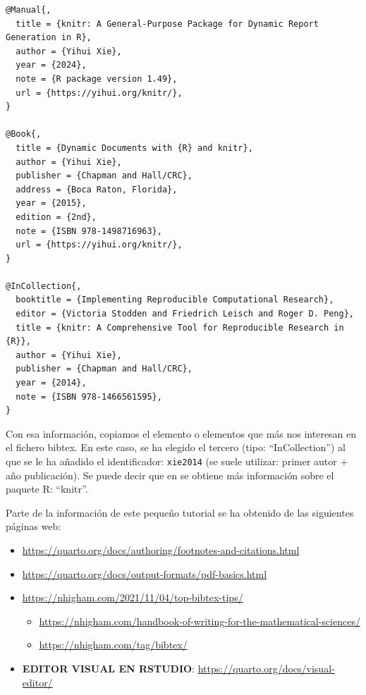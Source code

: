 \documentclass[
  11pt,
  a4paper,
  DIV=11,
  numbers=noendperiod]{scrartcl}
\providecommand{\tightlist}{%
  \setlength{\itemsep}{0pt}\setlength{\parskip}{0pt}}\usepackage{longtable,booktabs,array}
\theoremstyle{definition}
\theoremstyle{remark}
\begin{document}
\begin{verbatim}
@Manual{,
  title = {knitr: A General-Purpose Package for Dynamic Report Generation in R},
  author = {Yihui Xie},
  year = {2024},
  note = {R package version 1.49},
  url = {https://yihui.org/knitr/},
}

@Book{,
  title = {Dynamic Documents with {R} and knitr},
  author = {Yihui Xie},
  publisher = {Chapman and Hall/CRC},
  address = {Boca Raton, Florida},
  year = {2015},
  edition = {2nd},
  note = {ISBN 978-1498716963},
  url = {https://yihui.org/knitr/},
}

@InCollection{,
  booktitle = {Implementing Reproducible Computational Research},
  editor = {Victoria Stodden and Friedrich Leisch and Roger D. Peng},
  title = {knitr: A Comprehensive Tool for Reproducible Research in {R}},
  author = {Yihui Xie},
  publisher = {Chapman and Hall/CRC},
  year = {2014},
  note = {ISBN 978-1466561595},
}
\end{verbatim}

Con esa información, copiamos el elemento o elementos que más nos
interesan en el fichero bibtex. En este caso, se ha elegido el tercero
(tipo: ``InCollection'') al que se le ha añadido el identificador:
\texttt{xie2014} (se suele utilizar: primer autor + año publicación). Se
puede decir que en \citet{xie2014} se obtiene más información sobre el
paquete R: ``knitr''.

Parte de la información de este pequeño tutorial se ha obtenido de las
siguientes páginas web:

\begin{itemize}
\tightlist
\item
  \url{https://quarto.org/docs/authoring/footnotes-and-citations.html}
\item
  \url{https://quarto.org/docs/output-formats/pdf-basics.html}
\item
  \url{https://nhigham.com/2021/11/04/top-bibtex-tips/}

  \begin{itemize}
  \tightlist
  \item
    \url{https://nhigham.com/handbook-of-writing-for-the-mathematical-sciences/}
  \item
    \url{https://nhigham.com/tag/bibtex/}
  \end{itemize}
\item
  \textbf{EDITOR VISUAL EN RSTUDIO}:
  \url{https://quarto.org/docs/visual-editor/}
\end{itemize}

\newpage{}
\end{document}
